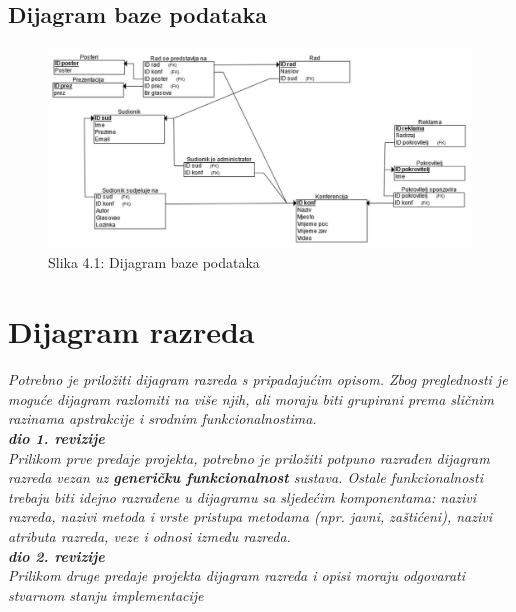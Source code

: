 		
				
			
\subsection{Dijagram baze podataka}

\begin{figure}[htb]
	\centering
	\includegraphics[width=15cm]{slike/dijagram.jpg}
	\caption{Slika 4.1: Dijagram baze podataka}
	\label{fig:fer-logo}
\end{figure}
			
			\eject
			
			
		\section{Dijagram razreda}
		
			\textit{Potrebno je priložiti dijagram razreda s pripadajućim opisom. Zbog preglednosti je moguće dijagram razlomiti na više njih, ali moraju biti grupirani prema sličnim razinama apstrakcije i srodnim funkcionalnostima.}\\
			
			\textbf{\textit{dio 1. revizije}}\\
			
			\textit{Prilikom prve predaje projekta, potrebno je priložiti potpuno razrađen dijagram razreda vezan uz \textbf{generičku funkcionalnost} sustava. Ostale funkcionalnosti trebaju biti idejno razrađene u dijagramu sa sljedećim komponentama: nazivi razreda, nazivi metoda i vrste pristupa metodama (npr. javni, zaštićeni), nazivi atributa razreda, veze i odnosi između razreda.}\\
			
			\textbf{\textit{dio 2. revizije}}\\			
			
			\textit{Prilikom druge predaje projekta dijagram razreda i opisi moraju odgovarati stvarnom stanju implementacije}
			
